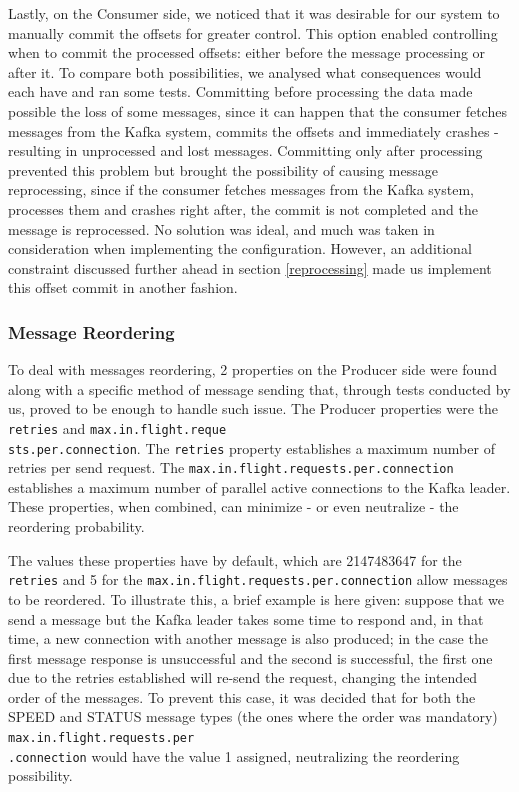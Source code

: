\documentclass[12pt]{article}
\begin{document}
Lastly, on the Consumer side, we noticed that it was desirable for our system to manually commit the offsets for greater control. 
This option enabled controlling when to commit the processed offsets: either before the message processing or after it. 
To compare both possibilities, we analysed what consequences would each have and ran some tests.
Committing before processing the data made possible the loss of some messages, since it can happen that the consumer fetches messages from the Kafka system, 
commits the offsets and immediately crashes - resulting in unprocessed and lost messages.
Committing only after processing prevented this problem but brought the possibility of causing message reprocessing, since if the consumer fetches messages
from the Kafka system, processes them and crashes right after, the commit is not completed and the message is reprocessed.
No solution was ideal, and much was taken in consideration when implementing the configuration.
However, an additional constraint discussed further ahead in section \ref{reprocessing} made us implement this offset commit in another fashion.


\subsubsection{Message Reordering}

To deal with messages reordering, 2 properties on the Producer side were found along with a specific method of message sending that, through tests conducted by 
us, proved to be enough to handle such issue.
The Producer properties were the \texttt{retries} and \texttt{max.in.flight.reque\\sts.per.connection}.
The \texttt{retries} property establishes a maximum number of retries per send request.
The \texttt{max.in.flight.requests.per.connection} establishes a maximum number of parallel active connections to the Kafka leader. 
These properties, when combined, can minimize - or even neutralize - the reordering probability. 

The values these properties have by default, which are 2147483647 for the \texttt{retries} and 5 for the \texttt{max.in.flight.requests.per.connection} allow 
messages to be reordered.
To illustrate this, a brief example is here given:
suppose that we send a message but the Kafka leader takes some time to respond and, in that time, a new connection with another message is also produced; 
in the case the first message response is unsuccessful and the second is successful, the first one due to the retries established will re-send the request, 
changing the intended order of the messages. 
To prevent this case, it was decided that for both the SPEED and STATUS message types (the ones where the order was mandatory) 
\texttt{max.in.flight.requests.per\\.connection} would have the value 1 assigned, neutralizing the reordering possibility.
\end{document}
